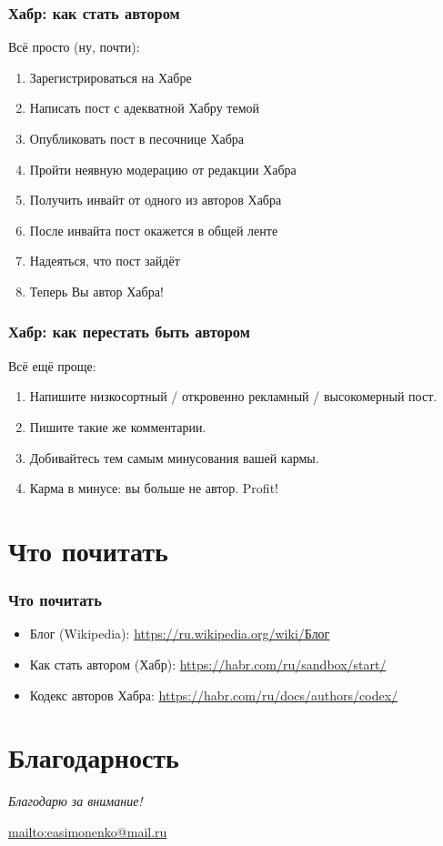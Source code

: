 \documentclass[14pt]{beamer}
\begin{document}
\begin{frame}
  \frametitle{Хабр: как стать автором}
  Всё просто (ну, почти):
  \begin{enumerate}
  \item Зарегистрироваться на Хабре
  \item Написать пост с адекватной Хабру темой
  \item Опубликовать пост в песочнице Хабра
  \item Пройти неявную модерацию от редакции Хабра
  \item Получить инвайт от одного из авторов Хабра
  \item После инвайта пост окажется в общей ленте
  \item Надеяться, что пост зайдёт
  \item Теперь Вы автор Хабра!
  \end{enumerate}
\end{frame}

\begin{frame}
  \frametitle{Хабр: как перестать быть автором}
  Всё ещё проще:
  \begin{enumerate}
  \item Напишите низкосортный / откровенно рекламный / высокомерный пост.
  \item Пишите такие же комментарии.
  \item Добивайтесь тем самым минусования вашей кармы.
  \item Карма в минусе: вы больше не автор. Profit!
  \end{enumerate}
\end{frame}

\section{Что почитать}

\begin{frame}
  \frametitle{Что почитать}
  \begin{itemize}
  \item Блог (Wikipedia): \url{https://ru.wikipedia.org/wiki/Блог}
  \item Как стать автором (Хабр): \url{https://habr.com/ru/sandbox/start/}
  \item Кодекс авторов Хабра: \url{https://habr.com/ru/docs/authors/codex/}
  \end{itemize}
\end{frame}

\section*{Благодарность}

\begin{frame}
  \center
  \textit{Благодарю за внимание!}

  \textbf{\textsl{\inserttitle}}

  \insertauthor

  \url{mailto:easimonenko@mail.ru}

  \insertinstitute
\end{frame}
\end{document}
